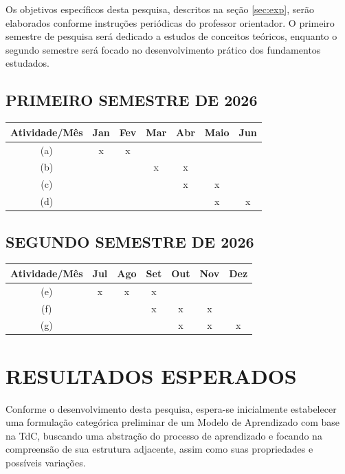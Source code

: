 \documentclass[12pt,a4paper]{article}
\begin{document}
Os objetivos específicos desta pesquisa, descritos na seção \ref{sec:exp}, serão elaborados conforme instruções periódicas do professor orientador. O primeiro semestre de pesquisa será dedicado a estudos de conceitos teóricos, enquanto o segundo semestre será focado no desenvolvimento prático dos fundamentos estudados.

\subsection{PRIMEIRO SEMESTRE DE 2026}
\label{sec:atv1}

\begin{center}
    \begin{tabular}{c c c c c c c}
        \hline
        Atividade/Mês & Jan & Fev & Mar & Abr & Maio & Jun\\
        \hline
        (a) & x & x & & & & \\
        (b) & & & x & x & & \\
        (c) & & & & x & x & \\
        (d) & & & & & x & x \\
        \hline
    \end{tabular}
\end{center}

\subsection{SEGUNDO SEMESTRE DE 2026}
\label{sec:atv2}

\begin{center}
    \begin{tabular}{c c c c c c c}
        \hline
        Atividade/Mês & Jul & Ago & Set & Out & Nov & Dez\\
        \hline
        (e) & x & x & x & & & \\
        (f) & & & x & x & x & \\
        (g) & & & & x & x & x \\
        \hline
    \end{tabular}
\end{center}


\section{RESULTADOS ESPERADOS}
\label{sec:res}

Conforme o desenvolvimento desta pesquisa, espera-se inicialmente estabelecer uma formulação categórica preliminar de um Modelo de Aprendizado com base na TdC, buscando uma abstração do processo de aprendizado e focando na compreensão de sua estrutura adjacente, assim como suas propriedades e possíveis variações.
\end{document}
